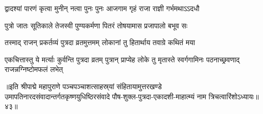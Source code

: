 \twolineshloka
{द्वादश्यां पारणं कृत्वा मुनीन् नत्वा पुनः पुनः}
{आजगाम गृहं राजा राज्ञी गर्भमथाऽऽदधौ}%

\twolineshloka
{पुत्रो जातः सूतिकाले तेजस्वी पुण्यकर्मणा}
{पितरं तोषयामास प्रजापालो बभूव सः}%

\twolineshloka
{तस्माद् राजन् प्रकर्तव्यं पुत्रदा व्रतमुत्तमम्}
{लोकानां तु हितार्थाय तवाग्रे कथितं मया}%

\threelineshloka
{एकचित्तास्तु ये मर्त्याः कुर्वन्ति पुत्रदा व्रतम्}
{पुत्रान् प्राप्येह लोके तु मृतास्ते स्वर्गगामिनः}
{पठनाच्छ्रवणाद् राजन्नग्निष्टोमफलं लभेत्}%

॥इति श्रीपाद्मे महापुराणे पञ्चपञ्चाशत्साहस्र्यां संहितायामुत्तरखण्डे उमापतिनारदसंवादान्तर्गतकृष्णयुधिष्ठिरसंवादे पौष-शुक्ल-पुत्रदा-एकादशी-माहात्म्यं नाम त्रिचत्वारिंशोऽध्यायः॥४३॥

\genMangalaShloka

\hyperref[sec:ekadashi_mahatmyam_padma_puranam]{\closesub}
\clearpage

